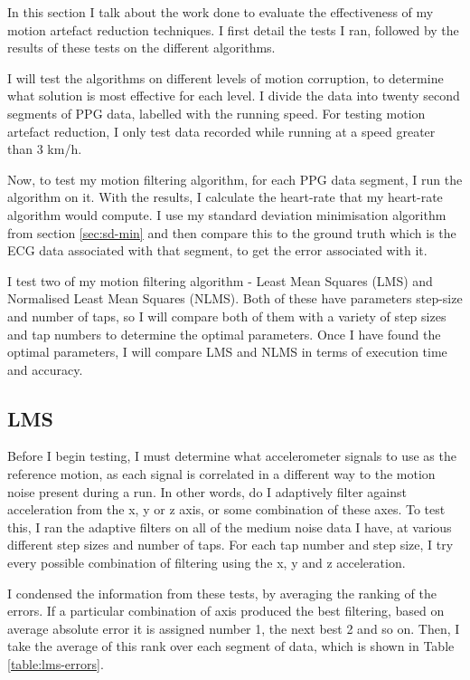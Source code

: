 \documentclass[12pt,a4paper,twoside,openright]{report}
\begin{document}
In this section I talk about the work done to evaluate the effectiveness of my
motion artefact reduction techniques. 
I first detail the tests I
ran, followed by the results of these tests on the different algorithms.

I will test the algorithms on different levels of motion corruption, to
determine what solution is most effective for each level. I divide the
data into twenty second segments of PPG data, labelled with the running speed. For
testing motion artefact reduction, I only test data recorded while running at
a speed greater than 3 km/h.

Now, to test my motion filtering algorithm, for each PPG data segment, I run
the algorithm on it. With the results, I calculate the heart-rate that my
heart-rate algorithm would compute. 
I use my standard deviation minimisation algorithm from section \ref{sec:sd-min}
and then compare this to the
ground truth which is the ECG data associated with that segment, to get the
error associated with it.

I test two of my motion filtering algorithm - Least Mean Squares (LMS) and Normalised Least Mean
Squares (NLMS). Both of these have parameters step-size and number of taps, so I will
compare both of them with a variety of step sizes and tap numbers to determine
the optimal parameters. Once I have found the optimal parameters, I will
compare LMS and NLMS in terms of execution time and accuracy.

\subsection{LMS}

Before I begin testing, I must determine what accelerometer signals to use as
the reference motion, as each signal is correlated in a different way to the
motion noise present during a run. In
other words, do I adaptively filter against acceleration from the x, y or z
axis, or some combination of these axes. To test this, I ran the adaptive
filters on all of the medium noise data I have, at various different step sizes
and number of taps. For each tap number and step size, I try every possible
combination of filtering using the x, y and z acceleration. 

I condensed the information from these tests, by averaging the ranking of
the errors. If a particular combination of axis produced the best filtering,
based on average absolute error 
it is assigned number 1, the next best 2 and so on. Then, I take the average
of this rank over each segment of data, which is shown in Table \ref{table:lms-errors}.
\end{document}
